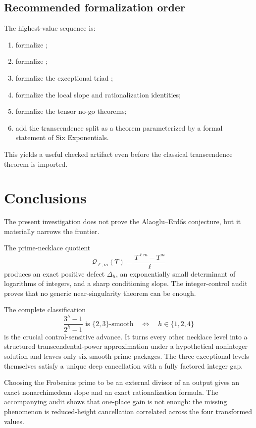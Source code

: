 \documentclass[11pt]{article}
\numberwithin{equation}{section}
\theoremstyle{definition}
\theoremstyle{remark}
\begin{document}
\subsection{Recommended formalization order}

The highest-value sequence is:
\begin{enumerate}[label=(\arabic*)]
  \item formalize ;
  \item formalize ;
  \item formalize the exceptional triad ;
  \item formalize the local slope and rationalization identities;
  \item formalize the tensor no-go theorems;
  \item add the transcendence split as a theorem parameterized by a formal statement of Six Exponentials.
\end{enumerate}
This yields a useful checked artifact even before the classical transcendence theorem is imported.

\section{Conclusions}

The present investigation does not prove the Alaoglu--Erd\H{o}s conjecture, but it materially narrows the frontier.

The prime-necklace quotient
\[
  \mathcal Q_{\ell,m}(T)=\frac{T^{\ell m}-T^m}{\ell}
\]
produces an exact positive defect $\Delta_h$, an exponentially small determinant of logarithms of integers, and a sharp conditioning slope.  The integer-control audit proves that no generic near-singularity theorem can be enough.

The complete classification
\[
  \frac{3^h-1}{2^h-1}\text{ is $\{2,3\}$-smooth}
  \quad\Longleftrightarrow\quad h\in\{1,2,4\}
\]
is the crucial control-sensitive advance.  It turns every other necklace level into a structured transcendental-power approximation under a hypothetical noninteger solution and leaves only six smooth prime packages.  The three exceptional levels themselves satisfy a unique deep cancellation with a fully factored integer gap.

Choosing the Frobenius prime to be an external divisor of an output gives an exact nonarchimedean slope and an exact rationalization formula.  The accompanying audit shows that one-place gain is not enough: the missing phenomenon is reduced-height cancellation correlated across the four transformed values.
\end{document}
